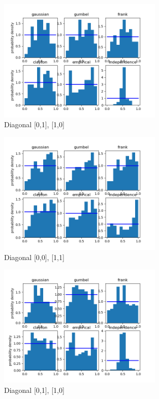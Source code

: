 \begin{figure}[h]
	\centering
	\includegraphics[width=0.7\textwidth]{2013-10-23_17_00-2013-10-23_18_00-1.png}
	\caption{Diagonal [0,1], [1,0]}
\end{figure}



\begin{figure}[h]
	\centering
	\includegraphics[width=0.7\textwidth]{2013-08-12_21_00-2013-08-12_22_00-0.png}
	\caption{Diagonal [0,0], [1,1]}
\end{figure}

\begin{figure}[h]
	\centering
	\includegraphics[width=0.7\textwidth]{2013-08-12_21_00-2013-08-12_22_00-1.png}
	\caption{Diagonal [0,1], [1,0]}
\end{figure}

